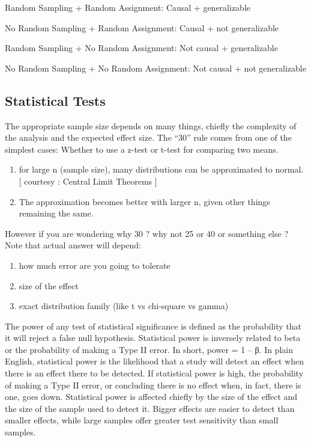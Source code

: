 \documentclass[]{book}
\theoremstyle{definition}
\theoremstyle{definition}
\theoremstyle{definition}
\theoremstyle{remark}
\begin{document}
Random Sampling + Random Assignment: Causal + generalizable

No Random Sampling + Random Assignment: Causal + not generalizable

Random Sampling + No Random Assignment: Not causal + generalizable

No Random Sampling + No Random Assignment: Not causal + not
generalizable

\subsection{Statistical Tests}\label{statistical-tests}

The appropriate sample size depends on many things, chiefly the
complexity of the analysis and the expected effect size. The ``30'' rule
comes from one of the simplest cases: Whether to use a z-test or t-test
for comparing two means.

\begin{enumerate}
\def\labelenumi{\arabic{enumi})}
\item
  for large n (sample size), many distributions can be approximated to
  normal. {[} courtesy : Central Limit Theorems {]}
\item
  The approximation becomes better with larger n, given other things
  remaining the same.
\end{enumerate}

However if you are wondering why 30 ? why not 25 or 40 or something else
? Note that actual answer will depend:

\begin{enumerate}
\def\labelenumi{\arabic{enumi})}
\item
  how much error are you going to tolerate
\item
  size of the effect
\item
  exact distribution family (like t vs chi-square vs gamma)
\end{enumerate}

The power of any test of statistical significance is defined as the
probability that it will reject a false null hypothesis. Statistical
power is inversely related to beta or the probability of making a Type
II error. In short, power = 1 -- β. In plain English, statistical power
is the likelihood that a study will detect an effect when there is an
effect there to be detected. If statistical power is high, the
probability of making a Type II error, or concluding there is no effect
when, in fact, there is one, goes down. Statistical power is affected
chiefly by the size of the effect and the size of the sample used to
detect it. Bigger effects are easier to detect than smaller effects,
while large samples offer greater test sensitivity than small samples.
\end{document}
